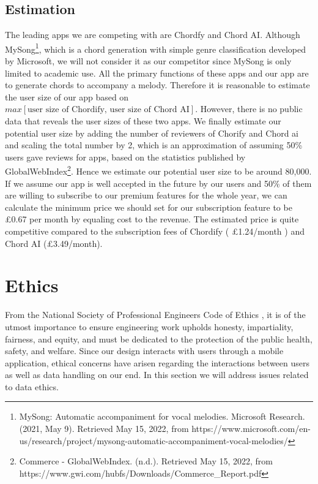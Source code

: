 \subsection{Estimation}
The leading apps we are competing with are Chordfy and Chord AI. Although MySong\footnote{MySong: Automatic accompaniment for vocal melodies. Microsoft Research. (2021, May 9). Retrieved May 15, 2022, from https://www.microsoft.com/en-us/research/project/mysong-automatic-accompaniment-vocal-melodies/ }, which is a chord generation with simple genre classification developed by Microsoft, we will not consider it as our competitor since MySong is only limited to academic use. All the primary functions of these apps and our app are to generate chords to accompany a melody.  Therefore it is reasonable to estimate the user size of our app based on $max[\text{user size of Chordify, user size of Chord AI}]$. However, there is no public data that reveals the user sizes of these two apps. We finally estimate our potential user size by adding the number of reviewers of Chorify and Chord ai and scaling the total number by 2, which is an approximation of assuming 50\% users gave reviews for apps, based on the statistics published by GlobalWebIndex\footnote{Commerce - GlobalWebIndex. (n.d.). Retrieved May 15, 2022, from https://www.gwi.com/hubfs/Downloads/Commerce\_Report.pdf}. Hence we estimate our potential user size to be around 80,000. If we assume our app is well accepted in the future by our users and 50\% of them are willing to subscribe to our premium features for the whole year, we can calculate the minimum price we should set for our subscription feature to be £0.67 per month by equaling cost to the revenue. The estimated price is quite competitive compared to the subscription fees of Chordify ( £1.24/month ) and Chord AI (£3.49/month).
\section{Ethics}
\label{sec:dataethics}
From the National Society of Professional Engineers Code of Ethics , it is of the utmost 
importance to ensure engineering work upholds honesty, impartiality, fairness, and equity, and must be dedicated to 
the protection of the public health, safety, and welfare. Since our design interacts with users
through a mobile application, ethical concerns have arisen regarding the interactions between users 
as well as data handling on our end. In this section we will address issues related to data ethics.

